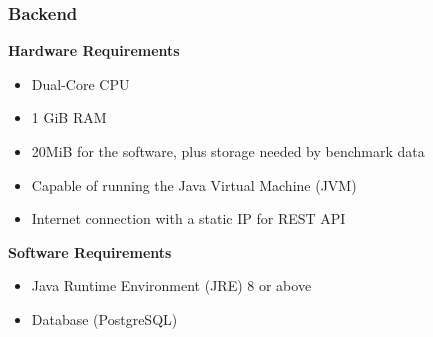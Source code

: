 \subsubsection*{Backend}

\textbf{Hardware Requirements}
\begin{itemize}
    \item Dual-Core CPU
    \item 1 GiB RAM
    \item 20MiB for the software, plus storage needed by benchmark data
    \item Capable of running the Java Virtual Machine (JVM)
    \item Internet connection with a static IP for REST API
\end{itemize}

\textbf{Software Requirements}
\begin{itemize}
    \item Java Runtime Environment (JRE) 8 or above
    \item Database (PostgreSQL)
\end{itemize}
